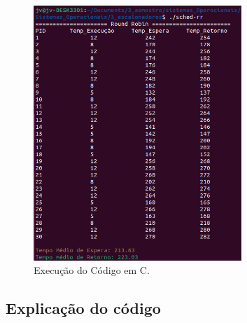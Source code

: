 \documentclass[
	12pt,				%
	openright,			%
	oneside,			%
	a4paper,			%
	chapter=TITLE,		%
	english,			%
	french,				%
	spanish,			%
	brazil				%
	]{abntex2}
\theoremstyle{definition}
\begin{document}
\begin{figure}[H]
    \centering
    \includegraphics[width=0.7\textwidth]{imagens/rr_run.png}
    \caption{Execução do Código em C.}
    \label{fig:rrun}
\end{figure}

\subsection{Explicação do código}
\end{document}
